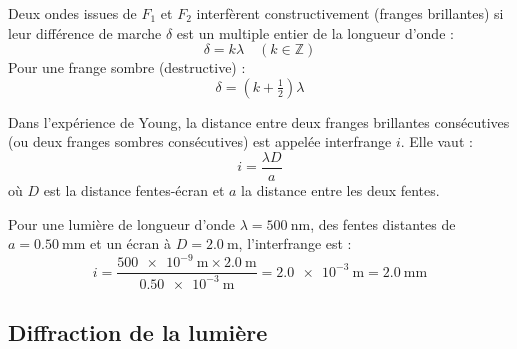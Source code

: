 \begin{illus}
\end{illus}

\begin{loi}
Deux ondes issues de \(F_1\) et \(F_2\) interfèrent constructivement (franges brillantes) si leur différence de marche \(\delta\) est un multiple entier de la longueur d'onde :
\[
\delta = k \lambda \quad (k \in \mathbb{Z})
\]
Pour une frange sombre (destructive) :
\[
\delta = (k + \tfrac12) \lambda
\]
\end{loi}

\begin{propriete}[Interfrange]
Dans l'expérience de Young, la distance entre deux franges brillantes consécutives (ou deux franges sombres consécutives) est appelée interfrange \(i\). Elle vaut :
\[
i = \frac{\lambda D}{a}
\]
où \(D\) est la distance fentes-écran et \(a\) la distance entre les deux fentes.
\end{propriete}

\begin{exemple}
Pour une lumière de longueur d'onde \(\lambda = \SI{500}{\nano\metre}\), des fentes distantes de \(a = \SI{0.50}{\milli\metre}\) et un écran à \(D = \SI{2.0}{\metre}\), l'interfrange est :
\[
i = \frac{\SI{500e-9}{\metre} \times \SI{2.0}{\metre}}{\SI{0.50e-3}{\metre}} = \SI{2.0e-3}{\metre} = \SI{2.0}{\milli\metre}
\]
\end{exemple}

\subsection{Diffraction de la lumière}

